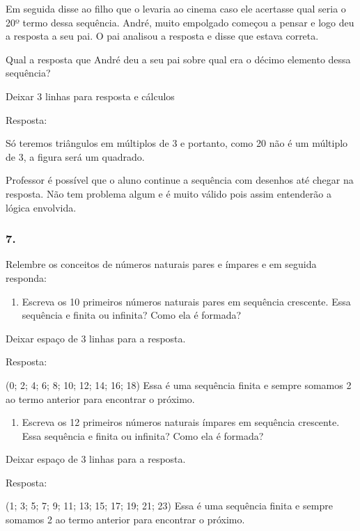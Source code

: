 Em seguida disse ao filho que o levaria ao cinema caso ele acertasse
qual seria o 20º termo dessa sequência. André, muito empolgado começou a
pensar e logo deu a resposta a seu pai. O pai analisou a resposta e
disse que estava correta.

Qual a resposta que André deu a seu pai sobre qual era o décimo elemento
dessa sequência?

Deixar 3 linhas para resposta e cálculos

Resposta:

Só teremos triângulos em múltiplos de 3 e portanto, como 20 não é um
múltiplo de 3, a figura será um quadrado.

Professor é possível que o aluno continue a sequência com desenhos até
chegar na resposta. Não tem problema algum e é muito válido pois assim
entenderão a lógica envolvida.

\subsubsection{7.}\label{section-32}

Relembre os conceitos de números naturais pares e ímpares e em seguida
responda:

\begin{enumerate}
\def\labelenumi{\alph{enumi})}
\item
  Escreva os 10 primeiros números naturais pares em sequência crescente.
  Essa sequência e finita ou infinita? Como ela é formada?
\end{enumerate}

Deixar espaço de 3 linhas para a resposta.

Resposta:

(0; 2; 4; 6; 8; 10; 12; 14; 16; 18) Essa é uma sequência finita e sempre
somamos 2 ao termo anterior para encontrar o próximo.

\begin{enumerate}
\def\labelenumi{\alph{enumi})}
\item
  Escreva os 12 primeiros números naturais ímpares em sequência
  crescente. Essa sequência e finita ou infinita? Como ela é formada?
\end{enumerate}

Deixar espaço de 3 linhas para a resposta.

Resposta:

(1; 3; 5; 7; 9; 11; 13; 15; 17; 19; 21; 23) Essa é uma sequência finita
e sempre somamos 2 ao termo anterior para encontrar o próximo.

